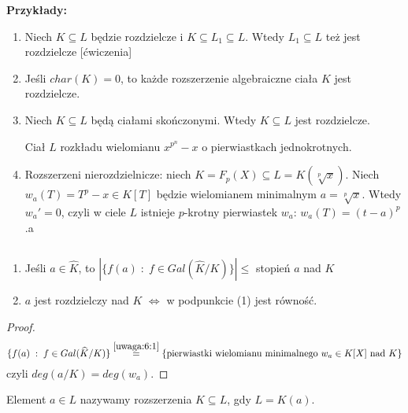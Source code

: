 \textbf{Przykłady:}
\begin{enumerate}
    \item Niech $K\subseteq L$ będzie rozdzielcze i $K\subseteq L_1\subseteq L$. Wtedy $L_1\subseteq L$ też jest rozdzielcze [ćwiczenia]
    \item Jeśli $char(K)=0$, to każde rozszerzenie algebraiczne ciała $K$ jest rozdzielcze.
    \item Niech $K\subseteq L$ będą ciałami skończonymi. Wtedy $K\subseteq L$ jest rozdzielcze.
    
    Ciał $L$ rozkładu wielomianu $x^{p^n}-x$ o pierwiastkach jednokrotnych.
    \item Rozszerzeni nierozdzielnicze: niech $K=F_p(X)\subseteq L=K(\sqrt[p]{x})$. Niech $w_a(T)=T^p-x\in K[T]$ będzie wielomianem minimalnym $a=\sqrt[p]{x}$. Wtedy $w_a'=0$, czyli w ciele $L$ istnieje $p$-krotny pierwiastek $w_a$: $w_a(T)=(t-a)^p$.a
\end{enumerate}

\begin{lemma}\label{lemat:6:7}
    $ $\newline
    \begin{enumerate}
        \item Jeśli $a\in\hat{K}$, to $|\{f(a)\;:\;f\in Gal(\hat{K}/K)\}|\leq$ stopień $a$ nad $K$
        \item $a$ jest rozdzielczy nad $K$ $\iff$ w podpunkcie (1) jest równość. 
    \end{enumerate}
\end{lemma}
\begin{proof}
    $$\{f(a)\;:\;f\in Gal(\hat{K}/K)\}\overset{\ref{uwaga:6:1}}{=}\{\text{pierwiastki wielomianu minimalnego }w_a\in K[X]\text{ nad } K\}$$
    czyli $deg(a/K)=deg(w_a)$.
\end{proof}

\begin{bbox}
    Element $a\in L$ nazywamy  rozszerzenia $K\subseteq L$, gdy $L=K(a)$.
\end{bbox}


